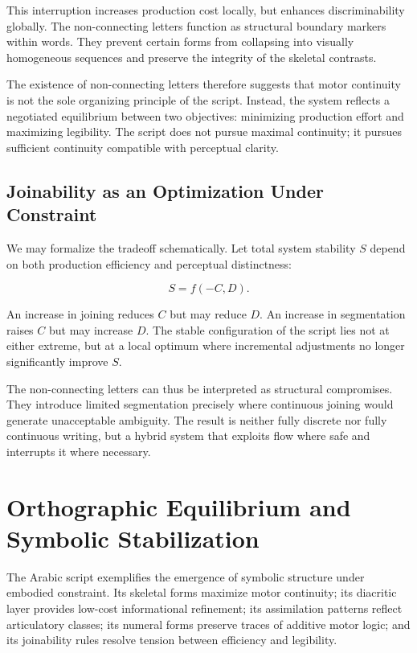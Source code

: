 \documentclass[11pt]{article}
\begin{document}
This interruption increases production cost locally, but enhances discriminability globally. The non-connecting letters function as structural boundary markers within words. They prevent certain forms from collapsing into visually homogeneous sequences and preserve the integrity of the skeletal contrasts.

The existence of non-connecting letters therefore suggests that motor continuity is not the sole organizing principle of the script. Instead, the system reflects a negotiated equilibrium between two objectives: minimizing production effort and maximizing legibility. The script does not pursue maximal continuity; it pursues sufficient continuity compatible with perceptual clarity.

\subsection{Joinability as an Optimization Under Constraint}

We may formalize the tradeoff schematically. Let total system stability $S$ depend on both production efficiency and perceptual distinctness:

\[
S = f(-C, D).
\]

An increase in joining reduces $C$ but may reduce $D$. An increase in segmentation raises $C$ but may increase $D$. The stable configuration of the script lies not at either extreme, but at a local optimum where incremental adjustments no longer significantly improve $S$.

The non-connecting letters can thus be interpreted as structural compromises. They introduce limited segmentation precisely where continuous joining would generate unacceptable ambiguity. The result is neither fully discrete nor fully continuous writing, but a hybrid system that exploits flow where safe and interrupts it where necessary.


\section{Orthographic Equilibrium and Symbolic Stabilization}

The Arabic script exemplifies the emergence of symbolic structure under embodied constraint. Its skeletal forms maximize motor continuity; its diacritic layer provides low-cost informational refinement; its assimilation patterns reflect articulatory classes; its numeral forms preserve traces of additive motor logic; and its joinability rules resolve tension between efficiency and legibility.
\end{document}
